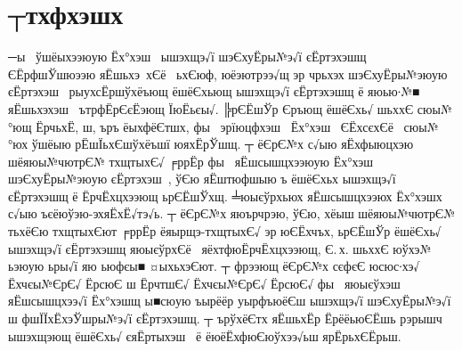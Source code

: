 \documentclass[12pt, a4paper, oneside]{article}
\begin{document}
\section{┬тхфхэшх} ─ы  ўшёыхээюую Ёх°хэш  ышэхщэ√ї шэЄхуЁры№э√ї єЁртэхэшщ ЄЁрфшЎшюээю яЁшьхэ хЄё  ьхЄюф, юёэютрээ√щ эр чрьхэх шэЄхуЁры№эюую єЁртэхэш  рыухсЁршўхёъющ ёшёЄхьющ ышэхщэ√ї єЁртэхэшщ ё яюью∙№■ яЁшьхэхэш  ътрфЁрЄєЁэющ ЇюЁьєы√. ╠рЄЁшЎр Єръющ ёшёЄхь√ шьххЄ сюы№°ющ ЁрчьхЁ, ш, ъръ ёыхфёЄтшх, фы  эрїюцфхэш  Ёх°хэш  ЄЁхсєхЄё  сюы№°юх ўшёыю рЁшЇьхЄшўхёъшї юяхЁрЎшщ. ┬ ёЄрЄ№х \cite{Lepik3} с√ыю яЁхфыюцхэю шёяюы№чютрЄ№ тхщтыхЄ√ ╒ррЁр фы  яЁшсышцхээюую Ёх°хэш  шэЄхуЁры№эюую єЁртэхэш , ўЄю яЁштюфшыю ъ ёшёЄхьх ышэхщэ√ї єЁртэхэшщ ё ЁрчЁхцхээющ ьрЄЁшЎхщ. ╧юыєўрхьюх яЁшсышцхээюх Ёх°хэшх с√ыю ъєёюўэю-эхяЁхЁ√тэ√ь. ┬ ёЄрЄ№х \cite{Blatov}  яюърчрэю, ўЄю, хёыш шёяюы№чютрЄ№ тьхёЄю тхщтыхЄют ╒ррЁр ёяырщэ-тхщтыхЄ√ эр юЄЁхчъх, ьрЄЁшЎр ёшёЄхь√ ышэхщэ√ї єЁртэхэшщ яюыєўрхЄё  яёхтфюЁрчЁхцхээющ, Є.\,х. шьххЄ юўхэ№ ьэюую ьры√ї яю ьюфєы■ ¤ыхьхэЄют. ┬ фрээющ ёЄрЄ№х сєфєЄ юсюс∙хэ√ Ёхчєы№ЄрЄ√ ЁрсюЄ \cite{Lepik1, Lepik2, Lepik3, Lepik4, Lepik} ш ЁрчтшЄ√ Ёхчєы№ЄрЄ√ ЁрсюЄ√  \cite{Blatov} фы  яюыєўхэш  яЁшсышцхээ√ї Ёх°хэшщ ы■сюую ъырёёр уырфъюёЄш ышэхщэ√ї шэЄхуЁры№э√ї ш фшЇЇхЁхэЎшры№э√ї єЁртэхэшщ. ┬ ърўхёЄтх яЁшьхЁр ЁрёёьюЄЁшь рэрышч ышэхщэющ ёшёЄхь√ єяЁртыхэш   ё ёюёЁхфюЄюўхээ√ьш ярЁрьхЄЁрьш.
\end{document}

